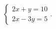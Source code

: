 $\displaystyle
\left\{
\begin{array}{l}
\displaystyle 2x + y = 10 \\
\displaystyle 2x - 3y = 5
\end{array}
\right.
$.
